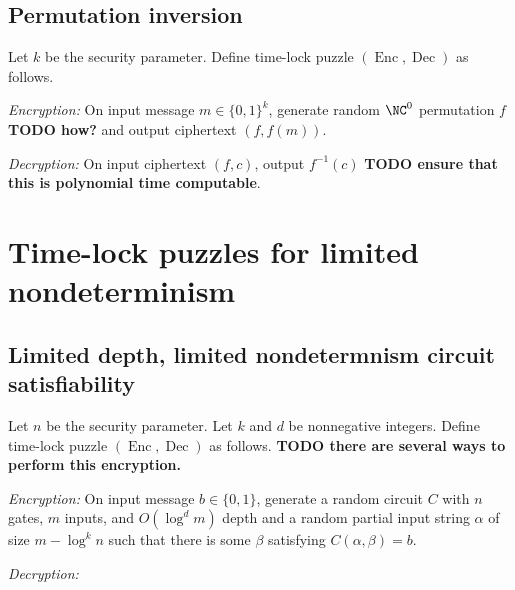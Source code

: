\documentclass{article}
\newcommand{\todo}[1]{\textbf{TODO #1}}
\newcommand{\Enc}{\operatorname{Enc}}
\newcommand{\Dec}{\operatorname{Dec}}
\begin{document}
\subsection{Permutation inversion}

\begin{protocol}
  Let $k$ be the security parameter.
  Define time-lock puzzle $(\Enc, \Dec)$ as follows.

  \emph{Encryption:} On input message $m \in \{0, 1\}^k$, generate random $\NC^0$ permutation $f$ \todo{how?} and output ciphertext $(f, f(m))$.

  \emph{Decryption:} On input ciphertext $(f, c)$, output $f^{-1}(c)$ \todo{ensure that this is polynomial time computable}.
\end{protocol}

\section{Time-lock puzzles for limited nondeterminism}

\subsection{Limited depth, limited nondetermnism circuit satisfiability}

\begin{protocol}
  Let $n$ be the security parameter.
  Let $k$ and $d$ be nonnegative integers.
  Define time-lock puzzle $(\Enc, \Dec)$ as follows.
  \todo{there are several ways to perform this encryption.}

  \emph{Encryption:} On input message $b \in \{0, 1\}$, generate a random circuit $C$ with $n$ gates, $m$ inputs, and $O(\log^d m)$ depth and a random partial input string $\alpha$ of size $m - \log^k n$ such that there is some $\beta$ satisfying $C(\alpha, \beta) = b$.

  \emph{Decryption:} 
\end{protocol}

\end{document}
